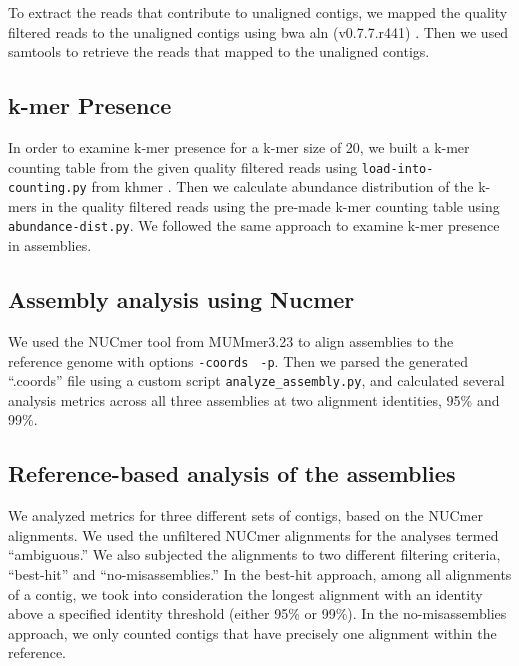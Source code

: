 \documentclass[10pt,a4paper,twocolumn]{article}
\begin{document}
To extract the reads that contribute to unaligned contigs, we mapped
the quality filtered reads to the unaligned contigs using bwa aln
(v0.7.7.r441) \cite{bwa}.  Then we used samtools to retrieve the reads
that mapped to the unaligned contigs.





\subsection*{k-mer Presence}
In order to examine k-mer presence for a k-mer size of 20, we built a
k-mer counting table from the given quality filtered reads using
{\tt{load-into-counting.py}} from khmer \cite{khmer2016}. Then we
calculate abundance distribution of the k-mers in the quality filtered
reads using the pre-made k-mer counting table using
{\tt{abundance-dist.py}}. We followed the same approach to examine
k-mer presence in assemblies.

\subsection*{Assembly analysis using Nucmer}

We used the NUCmer tool from MUMmer3.23 \cite{mummer3.0} to align
assemblies to the reference genome with options {\tt \--coords} {\tt
  -p}. Then we parsed the generated ``.coords'' file using a custom
script {\tt{analyze\_assembly.py}}, and calculated several analysis
metrics across all three assemblies at two alignment identities, 95\% and 99\%.

\subsection*{Reference-based analysis of the assemblies}

We analyzed metrics for three different sets of contigs, based on the
NUCmer alignments.  We used the unfiltered NUCmer alignments for the
analyses termed ``ambiguous.''  We also subjected the alignments to
two different filtering criteria, ``best-hit'' and
``no-misassemblies.''
In the best-hit approach, among all alignments of a contig, we took
into consideration the longest alignment with an identity above a specified
identity threshold (either 95\% or 99\%).
In the no-misassemblies approach, we only counted contigs that have
precisely one alignment within the reference.
\end{document}
